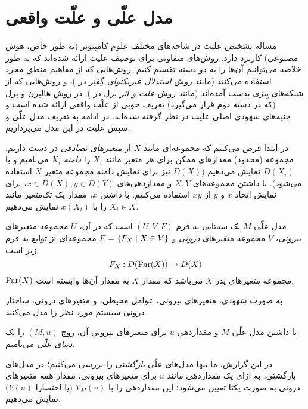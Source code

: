 \section{مدل علّی و علّت واقعی}\label{sec:causality}

مساله تشخیص علیت در شاخه‌های مختلف علوم کامپیوتر
(به طور خاص، هوش مصنوعی)
کاربرد دارد. روش‌های متفاوتی برای توصیف علیت ارائه شده‌اند
که به طور خلاصه می‌توانیم آن‌ها را به دو دسته تقسیم کنیم:
روش‌هایی که از مفاهیم منطق مجرد استفاده می‌کنند
(مانند روش
\textit{استدلال غیریکنوای}
گِفنِر در
\cite{geffner1990causal})،
و روش‌هایی که از شبکه‌های بِیزی بدست آمده‌اند
(مانند روش
\textit{علت و اثر}
پرل در
\cite{pearl1999reasoning}).
در روش هالپرن و پرل
(که در دسته دوم قرار می‌گیرد)
تعریف خوبی از علّت واقعی ارائه شده است و
جنبه‌های شهودی اصلی علیت در نظر گرفته شده‌اند.
در ادامه به تعریف مدل علّی
و سپس علیت در این مدل می‌پردازیم.

در ابتدا فرض می‌کنیم که مجموعه‌ای مانند
$X$
از
\textit{متغیرهای تصادفی}
در دست داریم.
مجموعه
(محدود)
مقدارهای ممکن برای هر متغیر مانند
$X_i$
را
\textit{دامنه} $X_i$
می‌نامیم و با
$D(X_i)$
نمایش می‌دهیم
($D(X)$
نیز برای نمایش دامنه مجموعه متغیر
$X$
استفاده می‌شود).
با داشتن مجموعه‌های
$X,Y$
و مقداردهی‌های
$x \in D(X), y \in D(Y)$،
برای نمایش اتحاد
$x$ و $y$
از
$xy$
استفاده می‌کنیم.
با داشتن
$x$،
مقدار یک تک‌متغیر
مانند
$X_i \in X$
را با
$x(X_i)$
نمایش می‌دهیم.

\begin{definition}\label{def:causal-model}
  مدل علّی
  $M$
  یک سه‌تایی به فرم
  $(U,V,F)$
  است که در آن،
  $U$
  مجموعه متغیرهای
  \textit{بیرونی}،
  $V$
  مجموعه متغیرهای
  \textit{درونی}
  و
  $F = \left\{ F_X \mid X \in V \right\}$
  مجموعه‌ای از توابع به فرم زیر است:
  \[ F_X: D(\operatorname{Par}(X)) \to D(X) \]
  $\operatorname{Par}(X)$
  مجموعه متغیرهای پدر
  $X$
  می‌باشد که مقدار
  $X$
  به مقدار آن‌ها وابسته است.
\end{definition}

به صورت شهودی، متغیرهای بیرونی، عوامل محیطی،
و متغیرهای درونی، ساختار درونی سیستم مورد نظر را
مدل می‌کنند.

\begin{definition}\label{def:causal-world}
  با داشتن مدل علّی
  $M$
  و مقداردهی
  $u$
  برای متغیرهای بیرونی آن،
  زوج
  $(M,u)$
  را یک
  \textit{دنیای علّی}
  می‌نامیم.
\end{definition}

در این گزارش، ما تنها مدل‌های علّی
\textit{بازگشتی}
را بررسی می‌کنیم؛ در مدل‌های بازگشتی،
به ازای یک مقداردهی مانند
$u$
برای متغیرهای بیرونی،
مقدار همه متغیرهای درونی
به صورت یکتا تعیین می‌شود؛
این مقداردهی را با
$Y_M(u)$ (یا اختصارا
$Y(u)$)
نمایش می‌دهیم.


